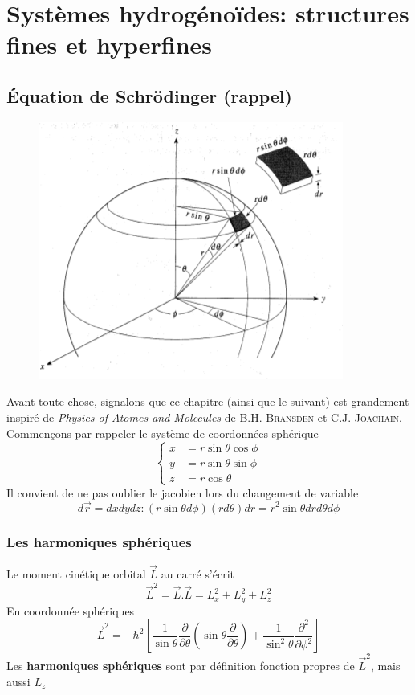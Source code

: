 \chapter{Systèmes hydrogénoïdes: structures fines et hyperfines}
\section{Équation de Schrödinger (rappel)}
	\begin{figure}
	\vspace{-18mm}
	\includegraphics[scale=0.4]{ch1/image1}
	\end{figure}
Avant toute chose, signalons que ce chapitre (ainsi que le suivant) est grandement inspiré
de \textit{Physics of Atomes and Molecules} de \textsc{B.H. Bransden} et \textsc{C.J.
Joachain}. Commençons par rappeler le système de coordonnées sphérique
\begin{equation}
\left\{\begin{array}{ll}
x &= r\sin\theta\cos\phi\\
y &= r\sin\theta\sin\phi\\
z &= r\cos\theta
\end{array}\right.
\end{equation}
Il convient de ne pas oublier le jacobien lors du changement de variable
\begin{equation}
d\vec{r} = dxdydz : (r\sin\theta d\phi)(rd\theta)dr = r^2\sin\theta drd\theta d\phi
\end{equation}

\subsection{Les harmoniques sphériques}
Le moment cinétique orbital $\vec{L}$ au carré s'écrit
\begin{equation}
\vec{L}^2 = \vec{L}.\vec L = L^2_x+L^2_y+L^2_z
\end{equation}
En coordonnée sphériques
\begin{equation}
\vec L^2 = -\hbar^2\left[\frac{1}{\sin\theta}\frac{\partial}{\partial \theta}\left(\sin\theta\frac{\partial}{
\partial \theta}\right)+\frac{1}{\sin^2\theta}\frac{\partial^2}{\partial\phi^2}\right]
\end{equation}
Les \textbf{harmoniques sphériques} sont par définition fonction propres de $\vec{L}^2$, mais aussi $L_z$\\


